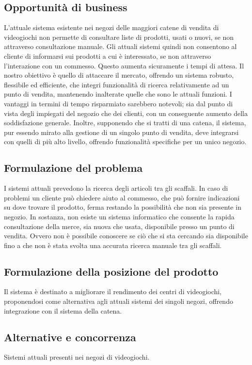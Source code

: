 \documentclass[a4paper,10pt]{report}
\begin{document}
  \subsection*{Opportunità di business}
  L'attuale sistema esistente nei negozi delle maggiori catene di vendita di videogiochi non
permette di consultare liste di prodotti, usati o nuovi, se non attraverso consultazione
manuale. Gli attuali sistemi quindi non consentono al cliente di informarsi sui prodotti a cui
è interessato, se non attraverso l'interazione con un commesso. Questo aumenta
sicuramente i tempi di attesa.
Il nostro obiettivo è quello di attaccare il mercato, offrendo un sistema robusto, flessibile ed
efficiente, che integri funzionalità di ricerca relativamente ad un punto di vendita,
mantenendo inalterate quelle che sono le attuali funzioni. I vantaggi in termini di tempo
risparmiato sarebbero notevoli; sia dal punto di vista degli impiegati del negozio che dei
clienti, con un conseguente aumento della soddisfazione generale.
Inoltre, supponendo che si tratti di una catena, il sistema, pur essendo mirato alla gestione
di un singolo punto di vendita, deve integrarsi con quelli di più alto livello, offrendo
funzionalità specifiche per un unico negozio.

  \subsection*{Formulazione del problema}
  I sistemi attuali prevedono la ricerca degli articoli tra gli scaffali. In caso di problemi un
cliente può chiedere aiuto al commesso, che può fornire indicazioni su dove trovare il
prodotto, ferma restando la possibilità che non sia presente in negozio.
In sostanza, non esiste un sistema informatico che consente la rapida consultazione della
merce, sia nuova che usata, disponibile presso un punto di vendita. Ovvero non è
possibile conoscere se ciò che si sta cercando sia disponibile fino a che non è stata svolta
una accurata ricerca manuale tra gli scaffali.

  \subsection*{Formulazione della posizione del prodotto}
  Il sistema è destinato a migliorare il rendimento dei centri di videogiochi, proponendosi
come alternativa agli attuali sistemi dei singoli negozi, offrendo integrazione con il sistema
della catena.

  \subsection*{Alternative e concorrenza}
  Sistemi attuali presenti nei negozi di videogiochi.
  
\end{document}
